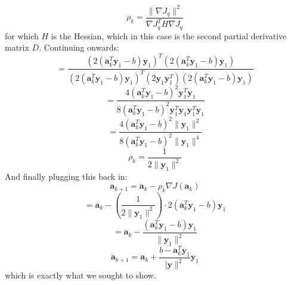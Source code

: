 \documentclass{article}
\begin{document}
{\[
  \rho_k = \frac{\lVert \nabla J_q \rVert^2}{\nabla J_q^T H\nabla J_q}
\]
for which \(H\) is the Hessian, which in this case is the second partial derivative matrix \(D\). Continuing onwards:
\[
  = \frac{(2(\mathbf{a}_k^T \mathbf{y}_1 - b)\mathbf{y}_1)^T (2(\mathbf{a}_k^T \mathbf{y}_1 - b)\mathbf{y}_1)}{(2(\mathbf{a}_k^T \mathbf{y}_1 - b)\mathbf{y}_1)^T (2\mathbf{y}_1 \mathbf{y}_1^T) (2(\mathbf{a}_k^T \mathbf{y}_1 - b)\mathbf{y}_1) }
\]
\[
  = \frac{4(\mathbf{a}_k^T \mathbf{y}_1 - b)^2 \mathbf{y}_1^T \mathbf{y}_1}{8(\mathbf{a}_k^T \mathbf{y}_1 - b)^2 \mathbf{y}_1^T \mathbf{y}_1 \mathbf{y}_1^T \mathbf{y}_1}
\] 
\[
  = \frac{4(\mathbf{a}_k^T \mathbf{y}_1 - b)^2 \lVert \mathbf{y}_1 \rVert^2}{8(\mathbf{a}_k^T \mathbf{y}_1 - b)^2 \lVert \mathbf{y}_1 \rVert^4}
\] 
\[
  \rho_k = \frac{1}{2 \lVert \mathbf{y}_1 \rVert^2}
\]
And finally plugging this back in:
\[
  \mathbf{a}_{k+1} = \mathbf{a}_k - \rho_k \nabla J(\mathbf{a}_k)
\]
\[
  = \mathbf{a}_k - (\frac{1}{2 \lVert \mathbf{y}_1 \rVert^2}) \cdot 2(\mathbf{a}_k^T \mathbf{y}_1 - b) \mathbf{y}_1
\]
\[
  = \mathbf{a}_k - \frac{(\mathbf{a}_k^T \mathbf{y}_1 - b) \mathbf{y}_1}{ \lVert \mathbf{y}_1 \rVert^2}
\]
\[
  \mathbf{a}_{k+1} = \mathbf{a}_k + \frac{b - \mathbf{a}_k^T \mathbf{y}_1}{\lvert \mathbf{y} \rVert^2} \mathbf{y}_1
\]
which is exactly what we sought to show.

}
\end{document}
